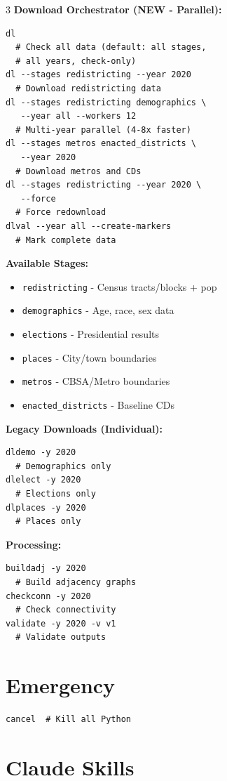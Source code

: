 \documentclass[10pt,landscape]{article}
\begin{document}
\begin{multicols}{3}
\textbf{Download Orchestrator (NEW - Parallel):}
\begin{Verbatim}[fontsize=\small,frame=single]
dl
  # Check all data (default: all stages,
  # all years, check-only)
dl --stages redistricting --year 2020
  # Download redistricting data
dl --stages redistricting demographics \
   --year all --workers 12
  # Multi-year parallel (4-8x faster)
dl --stages metros enacted_districts \
   --year 2020
  # Download metros and CDs
dl --stages redistricting --year 2020 \
   --force
  # Force redownload
dlval --year all --create-markers
  # Mark complete data
\end{Verbatim}

\textbf{Available Stages:}
\begin{itemize}\itemsep0pt
\item \texttt{redistricting} - Census tracts/blocks + pop
\item \texttt{demographics} - Age, race, sex data
\item \texttt{elections} - Presidential results
\item \texttt{places} - City/town boundaries
\item \texttt{metros} - CBSA/Metro boundaries
\item \texttt{enacted\_districts} - Baseline CDs
\end{itemize}

\textbf{Legacy Downloads (Individual):}
\begin{Verbatim}[fontsize=\small,frame=single]
dldemo -y 2020
  # Demographics only
dlelect -y 2020
  # Elections only
dlplaces -y 2020
  # Places only
\end{Verbatim}

\textbf{Processing:}
\begin{Verbatim}[fontsize=\small,frame=single]
buildadj -y 2020
  # Build adjacency graphs
checkconn -y 2020
  # Check connectivity
validate -y 2020 -v v1
  # Validate outputs
\end{Verbatim}

\section*{Emergency}

\begin{Verbatim}[fontsize=\small,frame=single]
cancel  # Kill all Python
\end{Verbatim}

\section*{Claude Skills}


\end{multicols}
\end{document}
